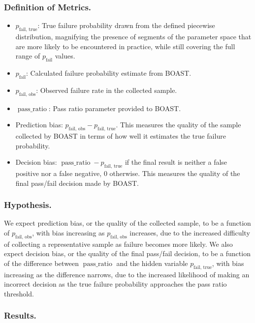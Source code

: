     \subsubsection{Definition of Metrics.}

        \begin{itemize}
            \item $p_\text{fail, true}$: True failure probability drawn from the defined piecewise distribution, magnifying the presence of segments of the parameter space that are more likely to be encountered in practice, while still covering the full range of $p_\text{fail}$ values.
            \item $p_\text{fail}$: Calculated failure probability estimate from BOAST.
            \item $p_\text{fail, obs}$: Observed failure rate in the collected sample.
            \item $\operatorname{pass\_ratio}$: Pass ratio parameter provided to BOAST.
            \item Prediction bias: $p_\text{fail, obs} - p_\text{fail, true}$. This measures the quality of the sample collected by BOAST in terms of how well it estimates the true failure probability.
            \item Decision bias: $\operatorname{pass\_ratio} - p_\text{fail, true}$ if the final result is neither a false positive nor a false negative, $0$ otherwise. This measures the quality of the final pass/fail decision made by BOAST.
        \end{itemize}

    \subsubsection{Hypothesis.}

    We expect prediction bias, or the quality of the collected sample, to be a function of $p_\text{fail, obs}$, with bias increasing as $p_\text{fail, obs}$ increases, due to the increased difficulty of collecting a representative sample as failure becomes more likely. We also expect decision bias, or the quality of the final pass/fail decision, to be a function of the difference between $\operatorname{pass\_ratio}$ and the hidden variable $p_\text{fail, true}$, with bias increasing as the difference narrows, due to the increased likelihood of making an incorrect decision as the true failure probability approaches the pass ratio threshold.

    \subsubsection{Results.}

